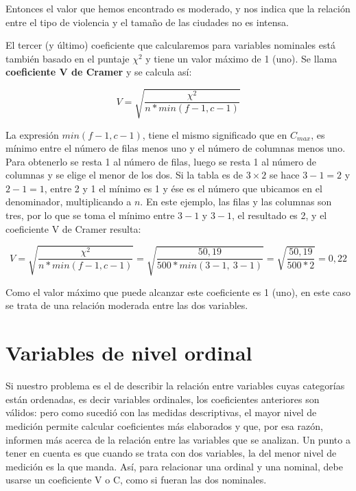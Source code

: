 \documentclass[]{book}
\begin{document}
Entonces el valor que hemos encontrado es moderado, y nos indica que la relación entre el tipo de violencia y el tamaño de las ciudades no es intensa.

El tercer (y último) coeficiente que calcularemos para variables
nominales está también basado en el puntaje \(\chi^{2}\) y tiene un valor máximo de 1 (uno). Se llama \textbf{coeficiente V de Cramer} y se calcula así:

\[V = \sqrt{\frac{\chi^{2}}{n*min(f - 1, c - 1)}}\]

La expresión \(min(f-1, c-1)\), tiene el mismo significado que en
\(C_{max}\), es mínimo entre el número de filas menos uno y el número de
columnas menos uno. Para obtenerlo se resta 1 al número de filas, luego se resta 1 al número de columnas y se elige el menor de los dos. Si la tabla es de \(3 \times 2\) se hace \(3 - 1 = 2\) y \(2 - 1 = 1\), entre 2 y 1 el mínimo es 1 y ése es el número que ubicamos en el denominador, multiplicando a \(n\). En este ejemplo, las filas y las columnas son tres, por lo que se toma el mínimo entre \(3-1\) y \(3-1\), el resultado es 2, y el coeficiente V de Cramer resulta:

\[V = \sqrt{\frac{\chi^{2}}{n*min(f - 1,c - 1)}} = \sqrt{\frac{50,19}{500*min(3 - 1,\ 3 - 1)}} = \sqrt{\frac{50,19}{500*2}} = 0,22\]

Como el valor máximo que puede alcanzar este coeficiente es 1 (uno), en este caso se trata de una relación moderada entre las dos variables.

\hypertarget{variables-de-nivel-ordinal}{%
\section{Variables de nivel ordinal}\label{variables-de-nivel-ordinal}}

Si nuestro problema es el de describir la relación entre variables cuyas
categorías están ordenadas, es decir variables ordinales, los
coeficientes anteriores son válidos: pero como sucedió con las medidas
descriptivas, el mayor nivel de medición permite calcular coeficientes
más elaborados y que, por esa razón, informen más acerca de la relación
entre las variables que se analizan. Un punto a tener en cuenta es que
cuando se trata con dos variables, la del menor nivel de medición es la
que manda. Así, para relacionar una ordinal y una nominal, debe usarse
un coeficiente V o C, como si fueran las dos nominales.
\end{document}

